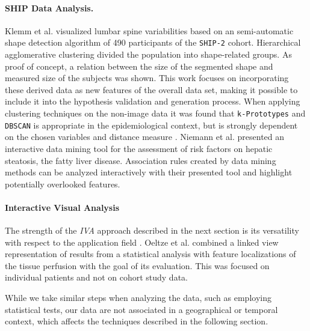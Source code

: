 \documentclass[journal]{style/vgtc} 			          %
\begin{document}
\paragraph{SHIP Data Analysis.}
Klemm et al. \cite{Klemm2013VMV} visualized lumbar spine variabilities based on an semi-automatic shape detection algorithm of 490 participants of the \texttt{SHIP-2} cohort.
%
Hierarchical agglomerative clustering divided the population into shape-related groups.
%
As proof of concept, a relation between the size of the segmented shape and measured size of the subjects was shown.
%
This work focuses on incorporating these derived data as new features of the overall data set, making it possible to include it into the hypothesis validation and generation process.
%
When applying clustering techniques on the non-image data it was found that \texttt{k-Prototypes} and \texttt{DBSCAN} is appropriate in the epidemiological context, but is strongly dependent on the chosen variables and distance measure \cite{Klemm2014BVM}.
%
Niemann et al. \cite{Niemann2014} presented an interactive data mining tool for the assessment of risk factors on hepatic steatosis, the fatty liver disease.
%
Association rules created by data mining methods can be analyzed interactively with their presented tool and highlight potentially overlooked features.

\paragraph{Interactive Visual Analysis}
The strength of the \emph{IVA} approach described in the next section is its versatility with respect to the application field \cite{Konyha2009}.
%
Oeltze et al. \cite{Oeltze2007} combined a linked view representation of results from a statistical analysis with feature localizations of the tissue perfusion with the goal of its evaluation.
%
This was focused on individual patients and not on cohort study data. 
%

While we take similar steps when analyzing the data, such as employing statistical tests, our data are not associated in a geographical or temporal context, which affects the techniques described in the following section.
\end{document}
